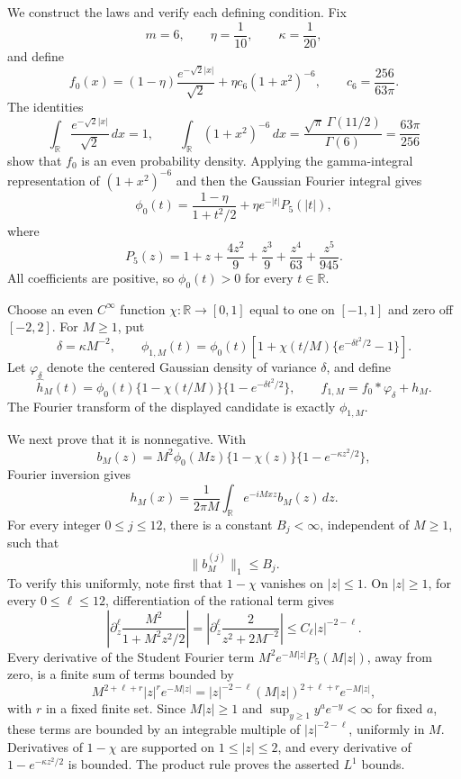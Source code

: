 We construct the laws and verify each defining condition.  Fix
\[
 m=6,\qquad \eta=\frac1{10},\qquad \kappa=\frac1{20},
\]
and define
\[
 f_0(x)=(1-\eta)\frac{e^{-\sqrt2|x|}}{\sqrt2}
       +\eta c_6(1+x^2)^{-6},
 \qquad c_6=\frac{256}{63\pi}.
\]
The identities
\[
 \int_{\mathbb R}\frac{e^{-\sqrt2|x|}}{\sqrt2}\,dx=1,
 \qquad
 \int_{\mathbb R}(1+x^2)^{-6}\,dx
 =\frac{\sqrt\pi\,\Gamma(11/2)}{\Gamma(6)}
 =\frac{63\pi}{256}
\]
show that \(f_0\) is an even probability density.  Applying the gamma-integral representation of \((1+x^2)^{-6}\) and then the Gaussian Fourier integral gives
\[
 \phi_0(t)=\frac{1-\eta}{1+t^2/2}
 +\eta e^{-|t|}P_5(|t|),
\]
where
\[
 P_5(z)=1+z+\frac{4z^2}{9}+\frac{z^3}{9}
       +\frac{z^4}{63}+\frac{z^5}{945}.
\]
All coefficients are positive, so \(\phi_0(t)>0\) for every \(t\in\mathbb R\).

Choose an even \(C^\infty\) function \(\chi:\mathbb R\to[0,1]\) equal to one on \([-1,1]\) and zero off \([-2,2]\).  For \(M\ge1\), put
\[
 \delta=\kappa M^{-2},\qquad
 \phi_{1,M}(t)=\phi_0(t)
 \left[1+\chi(t/M)\{e^{-\delta t^2/2}-1\}\right].
\]
Let \(\varphi_\delta\) denote the centered Gaussian density of variance \(\delta\), and define
\[
 \widehat h_M(t)=\phi_0(t)\{1-\chi(t/M)\}
                         \{1-e^{-\delta t^2/2}\},
 \qquad
 f_{1,M}=f_0*\varphi_\delta+h_M.
\]
The Fourier transform of the displayed candidate is exactly \(\phi_{1,M}\).

We next prove that it is nonnegative.  With
\[
 b_M(z)=M^2\phi_0(Mz)\{1-\chi(z)\}
                    \{1-e^{-\kappa z^2/2}\},
\]
Fourier inversion gives
\[
 h_M(x)=\frac1{2\pi M}\int_{\mathbb R}e^{-iMxz}b_M(z)\,dz.
\]
For every integer \(0\le j\le12\), there is a constant \(B_j<\infty\), independent of \(M\ge1\), such that
\[
 \|b_M^{(j)}\|_1\le B_j.
\]
To verify this uniformly, note first that \(1-\chi\) vanishes on \(|z|\le1\).  On \(|z|\ge1\), for every \(0\le\ell\le12\), differentiation of the rational term gives
\[
 \left|\partial_z^\ell
   \frac{M^2}{1+M^2z^2/2}\right|
 =\left|\partial_z^\ell
   \frac{2}{z^2+2M^{-2}}\right|
 \le C_\ell |z|^{-2-\ell}.
\]
Every derivative of the Student Fourier term \(M^2e^{-M|z|}P_5(M|z|)\), away from zero, is a finite sum of terms bounded by
\[
 M^{2+\ell+r}|z|^r e^{-M|z|}
 =|z|^{-2-\ell}(M|z|)^{2+\ell+r}e^{-M|z|},
\]
with \(r\) in a fixed finite set.  Since \(M|z|\ge1\) and
\(\sup_{y\ge1}y^a e^{-y}<\infty\) for fixed \(a\), these terms are bounded by an integrable multiple of \(|z|^{-2-\ell}\), uniformly in \(M\).  Derivatives of \(1-\chi\) are supported on \(1\le|z|\le2\), and every derivative of \(1-e^{-\kappa z^2/2}\) is bounded.  The product rule proves the asserted \(L^1\) bounds.

